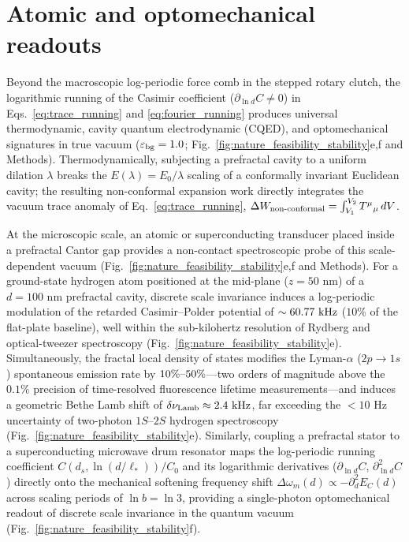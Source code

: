 \documentclass[pdflatex,sn-nature]{sn-jnl}
\begin{document}
\section*{Atomic and optomechanical readouts}
\label{sec:cqed_optomech}

Beyond the macroscopic log-periodic force comb in the stepped rotary clutch, the logarithmic running of the Casimir coefficient ($\partial_{\ln d}C \neq 0$) in Eqs.~\eqref{eq:trace_running} and \eqref{eq:fourier_running} produces universal thermodynamic, cavity quantum electrodynamic (CQED), and optomechanical signatures in true vacuum ($\varepsilon_{\rm bg}=1.0$; Fig.~\ref{fig:nature_feasibility_stability}e,f and Methods). Thermodynamically, subjecting a prefractal cavity to a uniform dilation $\lambda$ breaks the $E(\lambda) = E_0/\lambda$ scaling of a conformally invariant Euclidean cavity; the resulting non-conformal expansion work directly integrates the vacuum trace anomaly of Eq.~\eqref{eq:trace_running}, $\Delta W_{\rm non\text{-}conformal} = \int_{V_1}^{V_2} T^\mu{}_\mu \, dV$.

At the microscopic scale, an atomic or superconducting transducer placed inside a prefractal Cantor gap provides a non-contact spectroscopic probe of this scale-dependent vacuum (Fig.~\ref{fig:nature_feasibility_stability}e,f and Methods). For a ground-state hydrogen atom positioned at the mid-plane ($z = 50\text{ nm}$) of a $d = 100\text{ nm}$ prefractal cavity, discrete scale invariance induces a log-periodic modulation of the retarded Casimir--Polder potential\cite{casimirpolder1948} of $\sim 60.77{}\text{ kHz}$ ($10\%$ of the flat-plate baseline), well within the sub-kilohertz resolution of Rydberg and optical-tweezer spectroscopy\cite{safronova2018} (Fig.~\ref{fig:nature_feasibility_stability}e). Simultaneously, the fractal local density of states modifies the Lyman-$\alpha$ ($2p \to 1s$) spontaneous emission rate\cite{purcell1946} by $10{}\%\text{--}50{}\%$---two orders of magnitude above the $0.1\%$ precision of time-resolved fluorescence lifetime measurements\cite{lodahl2015}---and induces a geometric Bethe Lamb shift\cite{bethe1947} of $\delta\nu_{\rm Lamb} \approx 2.4{}\text{ kHz}$, far exceeding the $<10\text{ Hz}$ uncertainty of two-photon $1S\text{--}2S$ hydrogen spectroscopy\cite{parthey2011} (Fig.~\ref{fig:nature_feasibility_stability}e). Similarly, coupling a prefractal stator to a superconducting microwave drum resonator\cite{casimir_drum2025} maps the log-periodic running coefficient $C(d_s, \ln(d/\ell_*))/C_0$ and its logarithmic derivatives ($\partial_{\ln d}C$, $\partial_{\ln d}^2 C$) directly onto the mechanical softening frequency shift $\Delta\omega_m(d) \propto -\partial_d^2 E_C(d)$ across scaling periods of $\ln b = \ln 3$, providing a single-photon optomechanical readout of discrete scale invariance in the quantum vacuum (Fig.~\ref{fig:nature_feasibility_stability}f).
\end{document}
